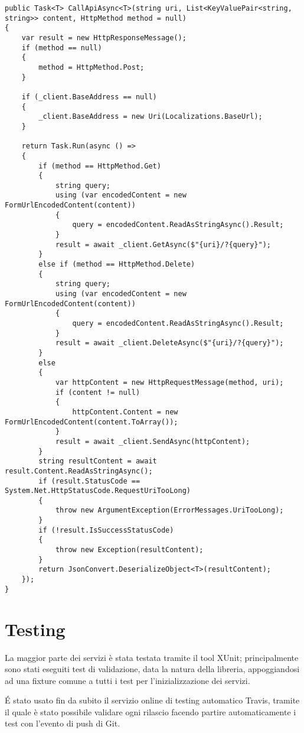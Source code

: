 \begin{lstlisting}[style=CSharpStyle, caption=Metodo generico del client per le chiamate HTTP]
public Task<T> CallApiAsync<T>(string uri, List<KeyValuePair<string, string>> content, HttpMethod method = null)
{
    var result = new HttpResponseMessage();
    if (method == null)
    {
        method = HttpMethod.Post;
    }

    if (_client.BaseAddress == null)
    {
        _client.BaseAddress = new Uri(Localizations.BaseUrl);
    }

    return Task.Run(async () =>
    {
        if (method == HttpMethod.Get)
        {
            string query;
            using (var encodedContent = new FormUrlEncodedContent(content))
            {
                query = encodedContent.ReadAsStringAsync().Result;
            }
            result = await _client.GetAsync($"{uri}/?{query}");
        }
        else if (method == HttpMethod.Delete)
        {
            string query;
            using (var encodedContent = new FormUrlEncodedContent(content))
            {
                query = encodedContent.ReadAsStringAsync().Result;
            }
            result = await _client.DeleteAsync($"{uri}/?{query}");
        }
        else
        {
            var httpContent = new HttpRequestMessage(method, uri);
            if (content != null)
            {
                httpContent.Content = new FormUrlEncodedContent(content.ToArray());
            }
            result = await _client.SendAsync(httpContent);
        }
        string resultContent = await result.Content.ReadAsStringAsync();
        if (result.StatusCode == System.Net.HttpStatusCode.RequestUriTooLong)
        {
            throw new ArgumentException(ErrorMessages.UriTooLong);
        }
        if (!result.IsSuccessStatusCode)
        {
            throw new Exception(resultContent); 
        }
        return JsonConvert.DeserializeObject<T>(resultContent);
    });
}
\end{lstlisting}

\section{Testing}
La maggior parte dei servizi è stata testata tramite il tool XUnit; principalmente sono stati eseguiti test di validazione, data la natura della libreria, appoggiandosi 
ad una fixture comune a tutti i test per l'inizializzazione dei servizi.

É stato usato fin da subito il servizio online di testing automatico Travis, tramite il quale è stato possibile validare ogni rilascio facendo 
partire automaticamente i test con l'evento di push di Git. 


